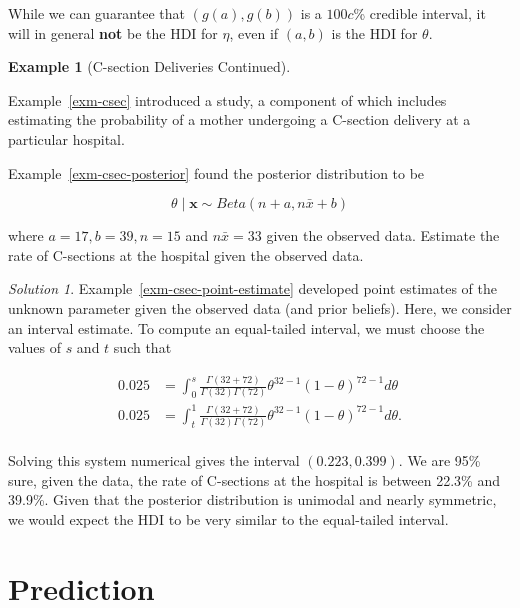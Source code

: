 \documentclass[
  letterpaper,
  DIV=11,
  numbers=noendperiod]{scrreprt}
\theoremstyle{definition}
\newtheorem{example}{Example}[chapter]
\theoremstyle{definition}
\theoremstyle{plain}
\theoremstyle{remark}
\newtheorem*{solution}{Solution}
\begin{document}
While we can guarantee that \(\left(g(a), g(b)\right)\) is a \(100c\)\%
credible interval, it will in general \textbf{not} be the HDI for
\(\eta\), even if \((a, b)\) is the HDI for \(\theta\).

\begin{example}[C-section Deliveries
Continued]\protect\hypertarget{exm-csec-interval-estimate}{}\label{exm-csec-interval-estimate}

Example~\ref{exm-csec} introduced a study, a component of which includes
estimating the probability of a mother undergoing a C-section delivery
at a particular hospital.

Example~\ref{exm-csec-posterior} found the posterior distribution to be

\[\theta \mid \mathbf{x} \sim Beta\left(n + a, n\bar{x} + b\right)\]

where \(a = 17, b = 39, n = 15\) and \(n\bar{x} = 33\) given the
observed data. Estimate the rate of C-sections at the hospital given the
observed data.

\end{example}

\begin{solution}

Example~\ref{exm-csec-point-estimate} developed point estimates of the
unknown parameter given the observed data (and prior beliefs). Here, we
consider an interval estimate. To compute an equal-tailed interval, we
must choose the values of \(s\) and \(t\) such that

\[
\begin{aligned}
  0.025 &= \int_{0}^{s} \frac{\Gamma(32 + 72)}{\Gamma(32) \Gamma(72)} \theta^{32 - 1} (1 - \theta)^{72 - 1} d\theta \\
  0.025 &= \int_{t}^{1} \frac{\Gamma(32 + 72)}{\Gamma(32) \Gamma(72)} \theta^{32 - 1} (1 - \theta)^{72 - 1} d\theta. \\
\end{aligned}
\]

Solving this system numerical gives the interval \((0.223, 0.399)\). We
are 95\% sure, given the data, the rate of C-sections at the hospital is
between 22.3\% and 39.9\%. Given that the posterior distribution is
unimodal and nearly symmetric, we would expect the HDI to be very
similar to the equal-tailed interval.

\end{solution}

\hypertarget{sec-prediction}{%
\chapter{Prediction}\label{sec-prediction}}
\end{document}
